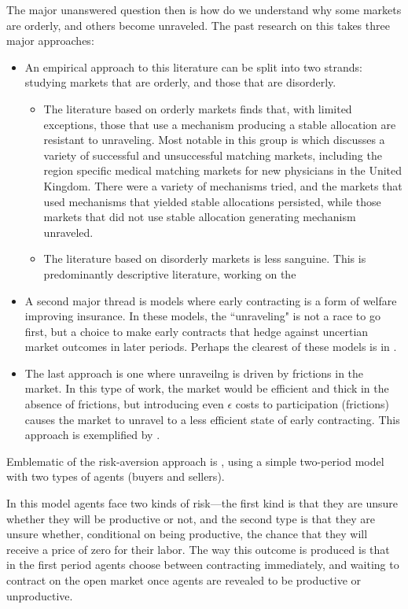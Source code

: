 \documentclass[AER]{AEA}
\begin{document}
The major unanswered question then is how do we understand why some markets are orderly, and others become unraveled.  The past research on this takes three major approaches:

\begin{itemize}
	\item An empirical approach to this literature can be split into two strands: studying markets that are orderly, and those that are disorderly. 
	\begin{itemize}
		\item The literature based on orderly markets finds that, with limited exceptions, those that use a mechanism producing a stable allocation are resistant to unraveling.  Most notable in this group is  \cite{Roth2002} which discusses a variety of successful and unsuccessful matching markets, including the region specific medical matching markets for new physicians in the United Kingdom.  There were a variety of mechanisms tried, and the markets that used mechanisms that yielded stable allocations persisted, while those markets that did not use stable allocation generating mechanism unraveled.
		\item The literature based on disorderly markets is less sanguine. This is predominantly descriptive literature, working on the 
	\end{itemize}
	 
	\item  A second major thread is models where early contracting is a form of welfare improving insurance. In these models, the ``unraveling" is not a race to go first, but a choice to make early contracts that hedge against uncertian market outcomes in later periods.  Perhaps the clearest of these models is in \cite{Li1998}.
	\item The last approach is one where unraveilng is driven by frictions in the market. In this type of work, the market would be efficient and thick in the absence of frictions, but introducing even $\epsilon$ costs to participation (frictions) causes the market to unravel to a less efficient state of early contracting.  This approach is exemplified by \cite{Damiano2005}.
\end{itemize}




Emblematic of the risk-aversion approach is \cite{Li1998}, using a simple two-period model with two types of agents (buyers and sellers).  

In this model agents face two kinds of risk—the first kind is that they are unsure whether they will be productive or not, and the second type is that they are unsure whether, conditional on being productive, the chance that they will receive a price of zero for their labor.  The way this outcome is produced is that in the first period agents choose between contracting immediately, and waiting to contract on the open market once agents are revealed to be productive or unproductive.  
\end{document}

